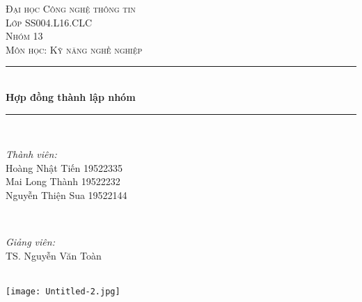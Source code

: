 \documentclass[12pt]{article}
\begin{document}
\begin{titlepage}
\newcommand{\HRule}{\rule{\linewidth}{0.5mm}} 
\center
 

\textsc{\LARGE Đại học Công nghệ thông tin}\\[2cm] %
\textsc{\Large Lớp SS004.L16.CLC}\\[1.5cm] %
\textsc{\LARGE \color{red} Nhóm 13}\\[0.4cm]
\textsc{\large Môn học: Kỹ năng nghề nghiệp }\\[0.5cm] %


\HRule \\[0.4cm]
{ \huge \bfseries Hợp đồng thành lập nhóm}\\[0.1cm] %
\HRule \\[1.5cm]
 

\begin{minipage}{0.4\textwidth}
\begin{flushleft} \large
\emph{Thành viên:}\\
Hoàng Nhật Tiến 19522335
\\
Mai Long Thành 19522232
\\
Nguyễn Thiện Sua 19522144
\end{flushleft}
\end{minipage}
~
\begin{minipage}{0.4\textwidth}
\begin{flushright} \large
\emph{Giảng viên:} \\
TS. Nguyễn Văn Toàn %
\end{flushright}
\end{minipage}\\[2cm]
\texttt{[image: Untitled-2.jpg]}\\[0.5cm]
\vfill %
\end{titlepage}
\end{document}
